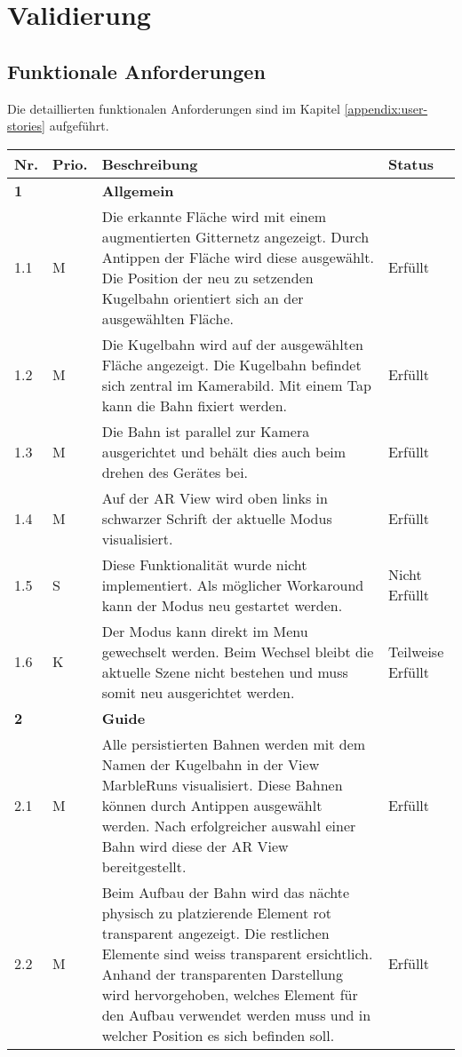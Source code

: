 \section{Validierung}


\subsection{Funktionale Anforderungen}

Die detaillierten funktionalen Anforderungen sind im Kapitel \ref{appendix:user-stories} aufgeführt.

\begin{longtable}{l l p{10cm} l}
	\hline
	\textbf{Nr.} & \textbf{Prio.} & \textbf{Beschreibung} & \textbf{Status} \\
	\hline
	\textbf{1} & & \textbf{Allgemein} & \\
	\hline
	1.1 & M & Die erkannte Fläche wird mit einem augmentierten Gitternetz angezeigt. Durch Antippen der Fläche wird diese ausgewählt. Die Position der neu zu setzenden Kugelbahn orientiert sich an der ausgewählten Fläche. & Erfüllt \\
	\hline
	1.2 & M & Die Kugelbahn wird auf der ausgewählten Fläche angezeigt. Die Kugelbahn befindet sich zentral im Kamerabild. Mit einem Tap kann die Bahn fixiert werden. & Erfüllt \\
	\hline
	1.3 & M & Die Bahn ist parallel zur Kamera ausgerichtet und behält dies auch beim drehen des Gerätes bei. & Erfüllt \\
	\hline
	1.4 & M & Auf der AR View wird oben links in schwarzer Schrift der aktuelle Modus visualisiert. & Erfüllt \\
	\hline
	1.5 & S & Diese Funktionalität wurde nicht implementiert. Als möglicher Workaround kann der Modus neu gestartet werden. & Nicht Erfüllt \\
	\hline
	1.6 & K & Der Modus kann direkt im Menu gewechselt werden. Beim Wechsel bleibt die aktuelle Szene nicht bestehen und muss somit neu ausgerichtet werden. & Teilweise Erfüllt \\
	\hline
	\textbf{2} & & \textbf{Guide} & \\
	\hline
	2.1 & M & Alle persistierten Bahnen werden mit dem Namen der Kugelbahn in der View MarbleRuns visualisiert. Diese Bahnen können durch Antippen ausgewählt werden. Nach erfolgreicher auswahl einer Bahn wird diese der AR View bereitgestellt. & Erfüllt \\
	\hline
	2.2 & M & Beim Aufbau der Bahn wird das nächte physisch zu platzierende Element rot transparent angezeigt. Die restlichen Elemente sind weiss transparent ersichtlich. Anhand der transparenten Darstellung wird hervorgehoben, welches Element für den Aufbau verwendet werden muss und in welcher Position es sich befinden soll.  & Erfüllt \\

\end{longtable}
